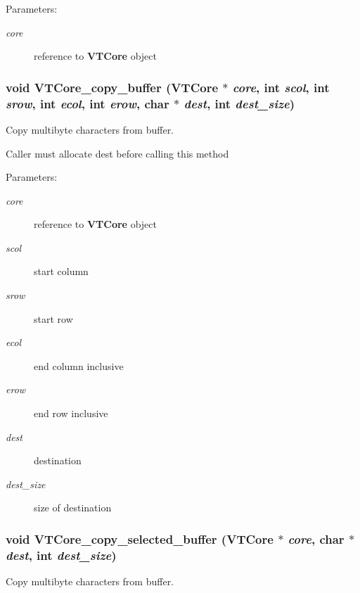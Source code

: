 \begin{Desc}
\item[Parameters:]
\begin{description}
\item[{\em core}]reference to {\bf VTCore} object \end{description}
\end{Desc}
\subsubsection{\setlength{\rightskip}{0pt plus 5cm}void VTCore\_\-copy\_\-buffer ({\bf VTCore} $\ast$ {\em core}, int {\em scol}, int {\em srow}, int {\em ecol}, int {\em erow}, char $\ast$ {\em dest}, int {\em dest\_\-size})}\label{core_8h_a54}


Copy multibyte characters from buffer.

\par
 Caller must allocate dest before calling this method \begin{Desc}
\item[Parameters:]
\begin{description}
\item[{\em core}]reference to {\bf VTCore} object \item[{\em scol}]start column \item[{\em srow}]start row \item[{\em ecol}]end column inclusive \item[{\em erow}]end row inclusive \item[{\em dest}]destination \item[{\em dest\_\-size}]size of destination \end{description}
\end{Desc}
\subsubsection{\setlength{\rightskip}{0pt plus 5cm}void VTCore\_\-copy\_\-selected\_\-buffer ({\bf VTCore} $\ast$ {\em core}, char $\ast$ {\em dest}, int {\em dest\_\-size})}\label{core_8h_a55}


Copy multibyte characters from buffer.

